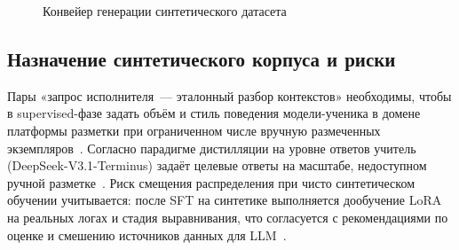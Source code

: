 \documentclass[times]{itmo-student-thesis}
\begin{document}
\begin{figure}[h]
\caption{Конвейер генерации синтетического датасета}\label{fig:synth-pipeline}
\centering
{}
\end{figure}

\subsection{Назначение синтетического корпуса и риски}

Пары «запрос исполнителя~--- эталонный разбор контекстов» необходимы,
чтобы в supervised-фазе задать объём и стиль поведения модели-ученика
в домене платформы разметки при ограниченном числе вручную размеченных
экземпляров~\cite{silicon-annotation,automated-annotation-validation}.
Согласно парадигме дистилляции на уровне ответов учитель (DeepSeek-V3.1-Terminus)
задаёт целевые ответы на масштабе, недоступном ручной разметке~\cite{hinton2015distilling}.
Риск смещения распределения при чисто синтетическом обучении учитывается:
после SFT на синтетике выполняется дообучение LoRA на реальных логах и
стадия выравнивания, что согласуется с рекомендациями по оценке и смешению
источников данных для LLM~\cite{llm-eval-survey}.
\end{document}
